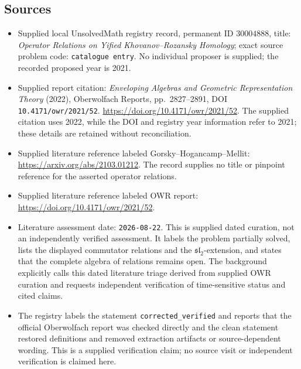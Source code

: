 \documentclass[11pt]{article}
\begin{document}
\subsection{Sources}
\begin{itemize}
\item Supplied local UnsolvedMath registry record, permanent ID \(30004888\), title: \emph{Operator Relations on Yified Khovanov--Rozansky Homology}; exact source problem code: \texttt{catalogue entry}. No individual proposer is supplied; the recorded proposed year is 2021.
\item Supplied report citation: \emph{Enveloping Algebras and Geometric Representation Theory} (2022), Oberwolfach Reports, pp.\ 2827--2891, DOI \texttt{10.4171/owr/2021/52}. \url{https://doi.org/10.4171/owr/2021/52}. The supplied citation uses 2022, while the DOI and registry year information refer to 2021; these details are retained without reconciliation.
\item Supplied literature reference labeled Gorsky--Hogancamp--Mellit: \url{https://arxiv.org/abs/2103.01212}. The record supplies no title or pinpoint reference for the asserted operator relations.
\item Supplied literature reference labeled OWR report: \url{https://doi.org/10.4171/owr/2021/52}.
\item Literature assessment date: \texttt{2026-08-22}. This is supplied dated curation, not an independently verified assessment. It labels the problem partially solved, lists the displayed commutator relations and the \(\mathfrak{sl}_2\)-extension, and states that the complete algebra of relations remains open. The background explicitly calls this dated literature triage derived from supplied OWR curation and requests independent verification of time-sensitive status and cited claims.
\item The registry labels the statement \texttt{corrected\_verified} and reports that the official Oberwolfach report was checked directly and the clean statement restored definitions and removed extraction artifacts or source-dependent wording. This is a supplied verification claim; no source visit or independent verification is claimed here.
\end{itemize}
\end{document}
